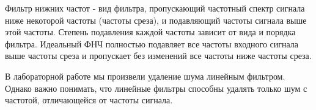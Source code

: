 Фильтр нижних частот - вид фильтра, пропускающий частотный спектр сигнала ниже некоторой частоты (частоты среза), и подавляющий частоты сигнала выше этой частоты. Степень подавления каждой частоты зависит от
вида и порядка фильтра. Идеальный ФНЧ полностью подавляет все частоты входного сигнала выше частоты среза и пропускает без изменений все частоты ниже частоты среза.

В лабораторной работе мы произвели удаление шума линейным фильтром. Однако важно понимать, что линейные фильтры способны удалять только шум с частотой, отличающейся от частоты сигнала.